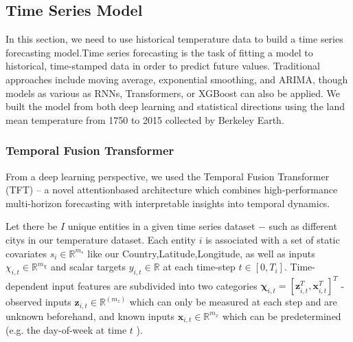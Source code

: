 \documentclass{apmcmthesis}
\begin{document}
\subsection{Time Series Model}
In this section, we need to use historical temperature data to build a time series forecasting model.Time series forecasting is the task of fitting a model to historical, time-stamped data in order to predict future values. Traditional approaches include moving average, exponential smoothing, and ARIMA, though models as various as RNNs, Transformers, or XGBoost can also be applied. We built the model from both deep learning and statistical directions using the land mean temperature from 1750 to 2015 collected by Berkeley Earth.
\subsubsection{Temporal Fusion Transformer}
From a deep learning perspective, we used the Temporal Fusion Transformer (TFT) -- a novel attentionbased architecture which combines high-performance multi-horizon forecasting
with interpretable insights into temporal dynamics.

Let there be $I$ unique entities in a given time series dataset $-$ such as different citys in our temperature dataset. Each entity $i$ is associated with a set of static covariates $s_i \in \mathbb{R}^{m_s}$ like our Country,Latitude,Longitude, as well as inputs $\chi_{i, t} \in \mathbb{R}^{m_\chi}$ and scalar targets $y_{i, t} \in \mathbb{R}$ at each time-step $t \in\left[0, T_i\right]$. Time-dependent input features are subdivided into two categories $\boldsymbol{\chi}_{i, t}=\left[\boldsymbol{z}_{i, t}^T, \boldsymbol{x}_{i, t}^T\right]^T$ - observed inputs $\boldsymbol{z}_{i, t} \in \mathbb{R}^{\left(m_z\right)}$ which can only be measured at each step and are unknown beforehand, and known inputs $\boldsymbol{x}_{i, t} \in \mathbb{R}^{m_x}$ which can be predetermined (e.g. the day-of-week at time $t$ ).
\end{document}
